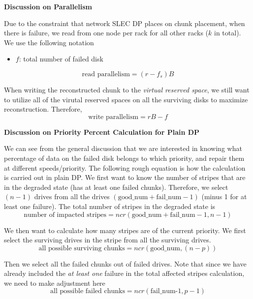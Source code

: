 \documentclass[journal]{IEEEtran}
\begin{document}
\hspace*{1cm}

\textbf{Discussion on Parallelism}

Due to the constraint that network SLEC DP places on chunk placement, when there is failure, we read from one node per rack for all other racks ($k$ in total). We use the following notation
\begin{itemize}
  \item $f$: total number of failed disk
\end{itemize}

\begin{equation*}
  \text{read parallelism}=(r-f_s)B
\end{equation*}

When writing the reconstructed chunk to the \textit{virtual reserved space}, we still want to utilize all of the virutal reserved spaces on all the surviving disks to maximize reconstruction. Therefore,
\begin{equation*}
  \text{write parallelism}=rB-f
\end{equation*}

\hspace*{1cm}

\textbf{Discussion on Priority Percent Calculation for Plain DP}

We can see from the general discussion that we are interested in knowing what percentage of data on the failed disk belongs to which priority, and repair them at different speeds/priority. The following rough equation is how the calculation is carried out in plain DP. We first want to know the number of stripes that are in the degraded state (has at least one failed chunks). Therefore, we select $(n-1)$ drives from all the drives $(\text{good\_num}+\text{fail\_num}-1)$ (minus 1 for at least one failure). The total number of stripes in the degraded state is
\begin{equation*}
  \text{number of impacted stripes}=ncr(\text{good\_num}+\text{fail\_num}-1, n-1)
\end{equation*}

We then want to calculate how many stripes are of the current priority. We first select the surviving drives in the stripe from all the surviving drives.
\begin{equation*}
  \text{all possible surviving chunks}=ncr(\text{good\_num}, (n-p))
\end{equation*}

Then we select all the failed chunks out of failed drives. Note that since we have already included the \textit{at least one} failure in the total affected stripes calculation, we need to make adjustment here
\begin{equation*}
  \text{all possible failed chunks}=ncr(\text{fail\_num-1}, p-1)
\end{equation*}
\end{document}
